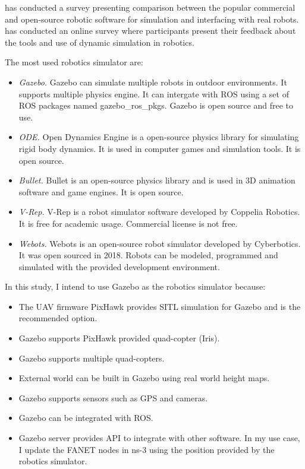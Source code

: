  has conducted a survey presenting comparison between the popular commercial and open-source robotic software for simulation and interfacing with real robots.   has conducted an online survey where participants present their feedback about the tools and use of dynamic simulation in robotics.

The most used robotics simulator are:
\begin{itemize}
	\item \textit{Gazebo.} Gazebo can simulate multiple robots in outdoor environments. It supports multiple physics engine. It can intergate with ROS using a set of ROS packages named gazebo\_ros\_pkgs. Gazebo is open source and free to use.
	\item \textit{ODE.} Open Dynamics Engine is a open-source physics library for simulating rigid body dynamics. It is used in computer games and simulation tools. It is open source.
	\item \textit{Bullet.} Bullet is an open-source physics library and is used in 3D animation software and game engines. It is open source.
	\item \textit{V-Rep.} V-Rep is a robot simulator software developed by Coppelia Robotics. It is free for academic usage. Commercial license is not free. 
	\item \textit{Webots.} Webots is an open-source robot simulator developed by Cyberbotics. It was open sourced in 2018. Robots can be modeled, programmed and simulated with the provided development environment.
\end{itemize}  

In this study, I intend to use Gazebo as the robotics simulator because:

\begin{itemize}
	\item The UAV firmware PixHawk provides SITL simulation for Gazebo and is the recommended option. 
	\item Gazebo supports PixHawk provided quad-copter (Iris).
	\item Gazebo supports multiple quad-copters.
	\item External world can be built in Gazebo using real world height maps.
	\item Gazebo supports sensors such as GPS and cameras.
	\item Gazebo can be integrated with ROS.
	\item Gazebo server provides API to integrate with other software. In my use case, I update the FANET nodes in ns-3 using the position provided by the robotics simulator. 
\end{itemize}

